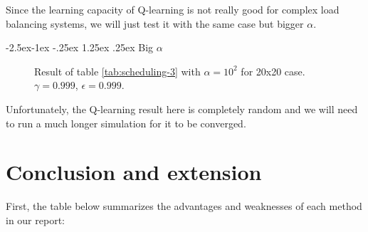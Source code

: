 \documentclass[
  a4paper, xcolor = usenames,dvipsnames]{article}
\makeatletter
\renewcommand\paragraph{\@startsection{paragraph}{4}{\z@}%
  {-2.5ex\@plus -1ex \@minus -.25ex}%
  {1.25ex \@plus .25ex}%
  {\normalfont\normalsize\bfseries}}
\theoremstyle{definition}
\theoremstyle{definition}
\theoremstyle{definition}
\theoremstyle{definition}
\theoremstyle{remark}
\makeatother
\begin{document}
Since the learning capacity of Q-learning is not really good for complex load balancing systems, we will just test it with the same case but bigger \(\alpha\).

\hypertarget{big-alpha-1}{%
\paragraph{\texorpdfstring{Big \(\alpha\)}{Big \textbackslash alpha}}\label{big-alpha-1}}



\begin{figure}

{\centering {}

}

\caption{Result of table \ref{tab:scheduling-3} with \(\alpha = 10^{2}\) for 20x20 case. \(\gamma = 0.999\), \(\epsilon = 0.999\).}\label{fig:20x20-lb-2}
\end{figure}

Unfortunately, the Q-learning result here is completely random and we will need to run a much longer simulation for it to be converged.

\hypertarget{conclusion-and-extension}{%
\section{Conclusion and extension}\label{conclusion-and-extension}}

First, the table below summarizes the advantages and weaknesses of each method in our report:
\end{document}
